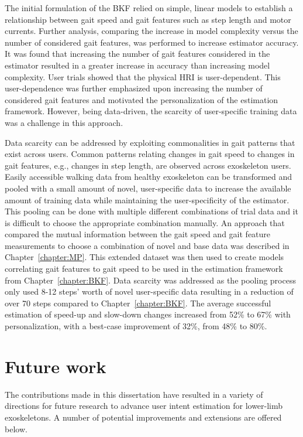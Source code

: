 The initial formulation of the BKF relied on simple, linear models to establish a relationship between gait speed and gait features such as step length and motor currents. Further analysis, comparing the increase in model complexity versus the number of considered gait features, was performed to increase estimator accuracy. It was found that increasing the number of gait features considered in the estimator resulted in a greater increase in accuracy than increasing model complexity. User trials showed that the physical HRI is user-dependent. This user-dependence was further emphasized upon increasing the number of considered gait features and motivated the personalization of the estimation framework. However, being data-driven, the scarcity of user-specific training data was a challenge in this approach. 

Data scarcity can be addressed by exploiting commonalities in gait patterns that exist across users. Common patterns relating changes in gait speed to changes in gait features, e.g., changes in step length, are observed across exoskeleton users. Easily accessible walking data from healthy exoskeleton can be transformed and pooled with a small amount of novel, user-specific data to increase the available amount of training data while maintaining the user-specificity of the estimator. This pooling can be done with multiple different combinations of trial data and it is difficult to choose the appropriate combination manually. An approach that compared the mutual information between the gait speed and gait feature measurements to choose a combination of novel and base data was described in Chapter~\ref{chapter:MP}. This extended dataset was then used to create models correlating gait features to gait speed to be used in the estimation framework from Chapter~\ref{chapter:BKF}. Data scarcity was addressed as the pooling process only used 8-12 steps' worth of novel user-specific data resulting in a reduction of over 70 steps compared to Chapter~\ref{chapter:BKF}. The average successful estimation of speed-up and slow-down changes increased from 52\% to 67\% with personalization, with a best-case improvement of 32\%, from 48\% to 80\%. 

\section{Future work}

The contributions made in this dissertation have resulted in a variety of directions for future research to advance user intent estimation for lower-limb exoskeletons. A number of potential improvements and extensions are offered below.

